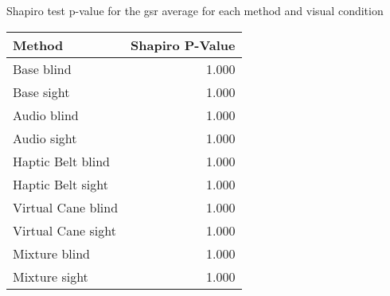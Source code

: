 
\centering
\caption{Shapiro test p-value for the gsr average for each method and visual condition}
\label{tab:shapiro_gsr}
\begin{tabular}{lr}
\toprule
            Method &  Shapiro P-Value \\
\midrule
        Base blind &            1.000 \\
        Base sight &            1.000 \\
       Audio blind &            1.000 \\
       Audio sight &            1.000 \\
 Haptic Belt blind &            1.000 \\
 Haptic Belt sight &            1.000 \\
Virtual Cane blind &            1.000 \\
Virtual Cane sight &            1.000 \\
     Mixture blind &            1.000 \\
     Mixture sight &            1.000 \\
\bottomrule
\end{tabular}
